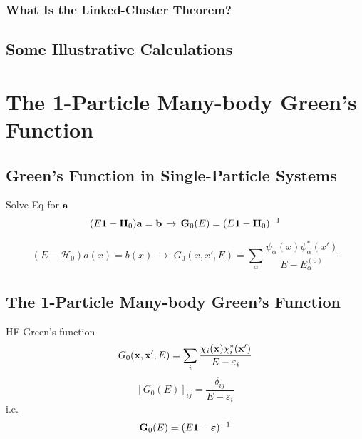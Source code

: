 \documentclass[a4paper]{article}
\DeclareMathOperator{\ra}{\rightarrow}
\newcommand{\iden}{{\large \bm{1}}}
\numberwithin{equation}{section}
\begin{document}
\subsubsection{What Is the Linked-Cluster Theorem?}

\subsection{Some Illustrative Calculations}


\section{The 1-Particle Many-body Green's Function}
\subsection{Green's Function in Single-Particle Systems}
Solve Eq for $ \vb{a} $
\begin{equation}\label{key}
(E\iden - \vb{H}_0) \vb{a} = \vb{b} \;\ra\; \vb{G}_0(E) = (E\iden - \vb{H}_0)^{-1}
\end{equation}

\begin{equation}\label{key}
(E - \mathscr{H}_0)a(x) = b(x) \;\ra\;
G_0(x,x',E) = \sum_\alpha \dfrac{\psi_\alpha(x) \psi_\alpha^*(x')}{E - E_\alpha^{(0)}}
\end{equation}

\subsection{The 1-Particle Many-body Green's Function}
HF Green's function
\begin{equation}\label{key}
G_0(\vb{x}, \vb{x}', E) = \sum_i \dfrac{\chi_i(\vb{x})\chi_i^*(\vb{x}')}{E - \varepsilon_i}
\end{equation}
\begin{equation}\label{key}
[G_0(E)]_{ij} = \dfrac{\delta_{ij}}{E - \varepsilon_i}
\end{equation}
i.e.
\begin{equation}\label{key}
\vb{G}_0(E) = (E\iden - \bm\varepsilon)^{-1}
\end{equation}
\end{document}
